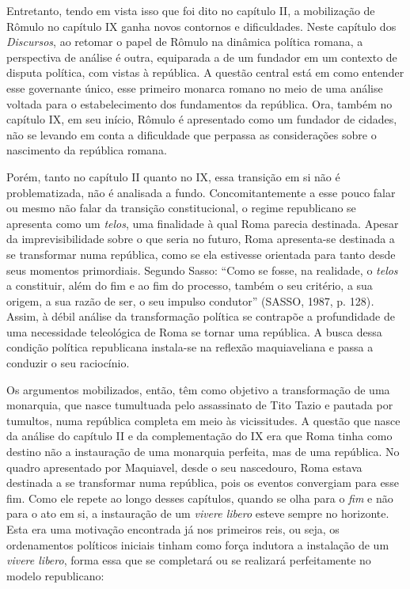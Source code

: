 Entretanto, tendo em vista isso que foi dito no capítulo II, a
mobilização de Rômulo no capítulo IX ganha novos contornos e
dificuldades. Neste capítulo dos \emph{Discursos}, ao retomar o papel de
Rômulo na dinâmica política romana, a perspectiva de análise é outra,
equiparada a de um fundador em um contexto de disputa política, com
vistas à república. A questão central está em como entender esse
governante único, esse primeiro monarca romano no meio de uma análise
voltada para o estabelecimento dos fundamentos da república. Ora, também
no capítulo IX, em seu início, Rômulo é apresentado como um fundador de
cidades, não se levando em conta a dificuldade que perpassa as
considerações sobre o nascimento da república romana.

Porém, tanto no capítulo II quanto no IX, essa transição em si não é
problematizada, não é analisada a fundo. Concomitantemente a esse pouco
falar ou mesmo não falar da transição constitucional, o regime
republicano se apresenta como um \emph{telos}, uma finalidade à qual
Roma parecia destinada. Apesar da imprevisibilidade sobre o que seria no
futuro, Roma apresenta-se destinada a se transformar numa república,
como se ela estivesse orientada para tanto desde seus momentos
primordiais. Segundo Sasso: ``Como se fosse, na realidade, o
\emph{telos} a constituir, além do fim e ao fim do processo, também o
seu critério, a sua origem, a sua razão de ser, o seu impulso condutor''
(SASSO, 1987, p. 128)\emph{.} Assim, à débil análise da transformação
política se contrapõe a profundidade de uma necessidade teleológica de
Roma se tornar uma república. A busca dessa condição política
republicana instala-se na reflexão maquiaveliana e passa a conduzir o
seu raciocínio.

Os argumentos mobilizados, então, têm como objetivo a transformação de
uma monarquia, que nasce tumultuada pelo assassinato de Tito Tazio e
pautada por tumultos, numa república completa em meio às vicissitudes. A
questão que nasce da análise do capítulo II e da complementação do IX
era que Roma tinha como destino não a instauração de uma monarquia
perfeita, mas de uma república. No quadro apresentado por Maquiavel,
desde o seu nascedouro, Roma estava destinada a se transformar numa
república, pois os eventos convergiam para esse fim. Como ele repete ao
longo desses capítulos, quando se olha para o \emph{fim} e não para o
ato em si, a instauração de um \emph{vivere libero} esteve sempre no
horizonte. Esta era uma motivação encontrada já nos primeiros reis, ou
seja, os ordenamentos políticos iniciais tinham como força indutora a
instalação de um \emph{vivere libero}, forma essa que se completará ou
se realizará perfeitamente no modelo republicano:

